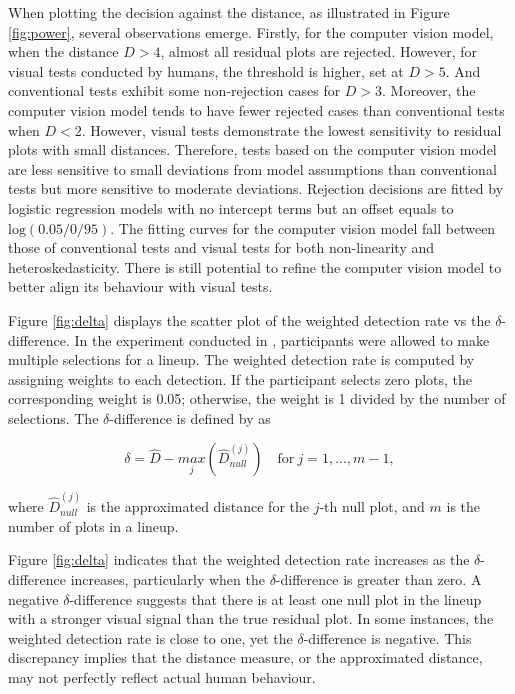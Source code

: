 \documentclass[]{interact}
\theoremstyle{plain}%
\theoremstyle{definition}
\theoremstyle{remark}
\begin{document}
When plotting the decision against the distance, as illustrated in
Figure \ref{fig:power}, several observations emerge. Firstly, for the
computer vision model, when the distance \(D > 4\), almost all residual
plots are rejected. However, for visual tests conducted by humans, the
threshold is higher, set at \(D > 5\). And conventional tests exhibit
some non-rejection cases for \(D > 3\). Moreover, the computer vision
model tends to have fewer rejected cases than conventional tests when
\(D < 2\). However, visual tests demonstrate the lowest sensitivity to
residual plots with small distances. Therefore, tests based on the
computer vision model are less sensitive to small deviations from model
assumptions than conventional tests but more sensitive to moderate
deviations. Rejection decisions are fitted by logistic regression models
with no intercept terms but an offset equals to
\(\text{log}(0.05/0/95)\). The fitting curves for the computer vision
model fall between those of conventional tests and visual tests for both
non-linearity and heteroskedasticity. There is still potential to refine
the computer vision model to better align its behaviour with visual
tests.

Figure \ref{fig:delta} displays the scatter plot of the weighted
detection rate vs the \(\delta\)-difference. In the experiment conducted
in \citet{li2023plot}, participants were allowed to make multiple
selections for a lineup. The weighted detection rate is computed by
assigning weights to each detection. If the participant selects zero
plots, the corresponding weight is 0.05; otherwise, the weight is 1
divided by the number of selections. The \(\delta\)-difference is
defined by \citet{chowdhury2018measuring} as

\begin{equation}
\delta = \hat{D} - \underset{j}{max}\left(\hat{D}_{null}^{(j)}\right) \quad \text{for}~j = 1,...,m-1,
\end{equation}

\noindent where \(\hat{D}_{null}^{(j)}\) is the approximated distance
for the \(j\)-th null plot, and \(m\) is the number of plots in a
lineup.

Figure \ref{fig:delta} indicates that the weighted detection rate
increases as the \(\delta\)-difference increases, particularly when the
\(\delta\)-difference is greater than zero. A negative
\(\delta\)-difference suggests that there is at least one null plot in
the lineup with a stronger visual signal than the true residual plot. In
some instances, the weighted detection rate is close to one, yet the
\(\delta\)-difference is negative. This discrepancy implies that the
distance measure, or the approximated distance, may not perfectly
reflect actual human behaviour.
\end{document}
